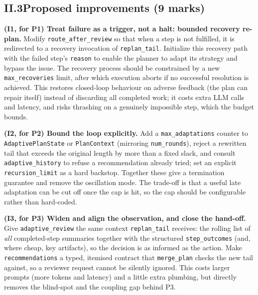 \documentclass[11pt,a4paper]{article}
\begin{document}
\subsection*{II.3\quad Proposed improvements (9 marks)}
\label{sec:partii-improvements}
\textbf{(I1, for P1) Treat failure as a trigger, not a halt: bounded recovery re-plan.}
Modify \texttt{route\_after\_review} so that when a step is not fulfilled, it is redirected to a recovery 
invocation of \texttt{replan\_tail}. Initialize this recovery path with the failed step’s \texttt{reason} 
to enable the planner to adapt its strategy and bypass the issue. The recovery process should be constrained 
by a new \texttt{max\_recoveries} limit, after which execution aborts if no successful resolution is achieved. 
This restores
closed-loop behaviour on adverse feedback (the plan can repair itself) instead of discarding all completed
work; it costs extra LLM calls and latency, and risks thrashing on a genuinely impossible step, which the
budget bounds.

\textbf{(I2, for P2) Bound the loop explicitly.}
Add a \texttt{max\_adaptations} counter to \texttt{AdaptivePlanState} or \texttt{PlanContext} (mirroring
\texttt{num\_rounds}), reject a rewritten tail that exceeds the original length by more than a fixed slack,
and consult \texttt{adaptive\_history} to refuse a recommendation already tried; set an explicit
\texttt{recursion\_limit} as a hard backstop. Together these give a termination guarantee and remove the
oscillation mode. The trade-off is that a useful late adaptation can be cut off once the cap is hit, so the
cap should be configurable rather than hard-coded.

\textbf{(I3, for P3) Widen and align the observation, and close the hand-off.}
Give \texttt{adaptive\_review} the same context \texttt{replan\_tail} receives: the rolling list
of \emph{all} completed-step summaries together with the structured \texttt{step\_outcomes} (and, where
cheap, key artifacts), so the decision is as informed as the action. Make \texttt{recommendations} a
typed, itemised contract that \texttt{merge\_plan} checks the new tail against, so a reviewer request cannot
be silently ignored. This costs larger prompts (more tokens and latency) and a little extra plumbing, but
directly removes the blind-spot and the coupling gap behind P3.




\end{document}

